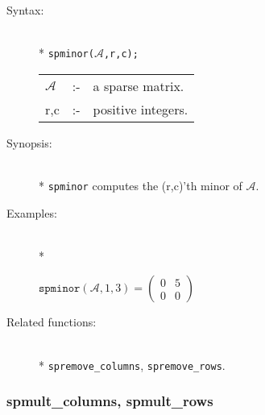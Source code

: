 \begin{description}
\item[Syntax:]\mbox{}\\*
\texttt{spminor($\mathcal{A}$,r,c);}\\[2mm]
\begin{tabular}{l l l} 
$\mathcal{A}$ &:-& a sparse matrix. \\
r,c        &:-& positive integers.
\end{tabular}

\item[Synopsis:]\mbox{}\\*
                \texttt{spminor} computes the (r,c)'th minor of $\mathcal{A}$.
 
\item[Examples:]\mbox{}\\*
\begin{flushleft}  
\begin{math}  
\texttt{spminor}(\mathcal{A},1,3) =
        \begin{pmatrix} 0 & 5 \\ 0 & 0  \end{pmatrix}
\end{math}  
\end{flushleft}

\item[Related functions:]\mbox{}\\*
 \texttt{spremove\_columns}, \texttt{spremove\_rows}.
\end{description}

\subsubsection{spmult\_columns, spmult\_rows}
\label{sparse:spmult_columns}

